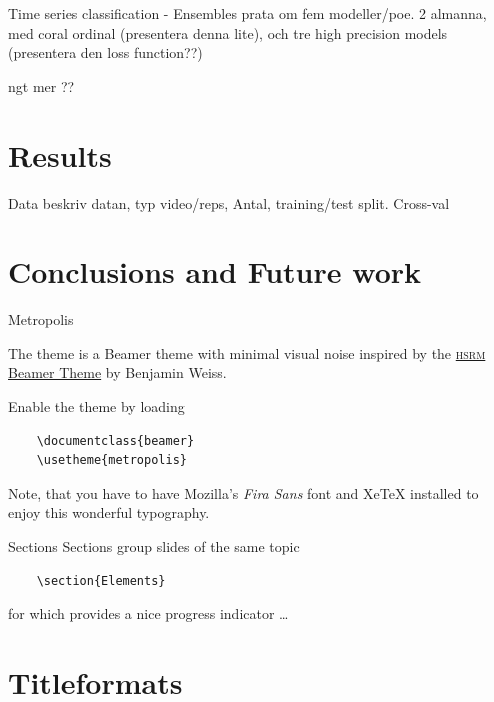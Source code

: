 \begin{frame}[fragile]{Time series classification - Ensembles}
  prata om fem modeller/poe. 2 almanna, med coral ordinal (presentera denna lite), och tre high precision models (presentera den loss function??)

  ngt mer ??

\end{frame}
\section{Results}
\begin{frame}[fragile]{Data}
  beskriv datan, typ video/reps, Antal, training/test split. Cross-val
\end{frame}
\section{Conclusions and Future work}

\begin{frame}[fragile]{Metropolis}

  The \themename theme is a Beamer theme with minimal visual noise
  inspired by the \href{https://github.com/hsrmbeamertheme/hsrmbeamertheme}{\textsc{hsrm} Beamer
  Theme} by Benjamin Weiss.

  Enable the theme by loading

  \begin{verbatim}    \documentclass{beamer}
    \usetheme{metropolis}\end{verbatim}

  Note, that you have to have Mozilla's \emph{Fira Sans} font and XeTeX
  installed to enjoy this wonderful typography.
\end{frame}
\begin{frame}[fragile]{Sections}
  Sections group slides of the same topic

  \begin{verbatim}    \section{Elements}\end{verbatim}

  for which \themename provides a nice progress indicator \ldots
\end{frame}

\section{Titleformats}


